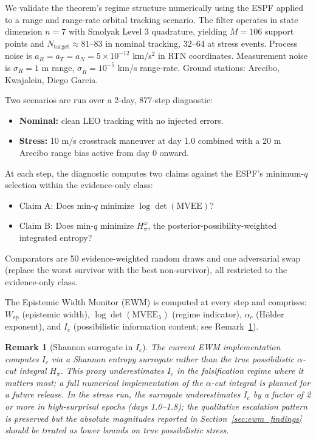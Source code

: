 \documentclass[12pt]{article}
\newtheorem{remark}[theorem]{Remark}
\begin{document}
We validate the theorem's regime structure numerically using the ESPF applied to a range and range-rate orbital tracking scenario. The filter operates in state dimension $n = 7$ with Smolyak Level 3 quadrature, yielding $M = 106$ support points and $N_{\mathrm{target}} \approx 81$--83 in nominal tracking, 32--64 at stress events. Process noise is $a_R = a_T = a_N = 5\times10^{-12}$ km/s$^2$ in RTN coordinates. Measurement noise is $\sigma_R = 1$ m range, $\sigma_{\dot{R}} = 10^{-5}$ km/s range-rate. Ground stations: Arecibo, Kwajalein, Diego Garcia.

Two scenarios are run over a 2-day, 877-step diagnostic:
\begin{itemize}
\item \textbf{Nominal:} clean LEO tracking with no injected errors.
\item \textbf{Stress:} 10 m/s crosstrack maneuver at day 1.0 combined with a 20 m Arecibo range bias active from day 0 onward.
\end{itemize}

At each step, the diagnostic computes two claims against the ESPF's minimum-$q$ selection within the evidence-only class:
\begin{itemize}
\item Claim A: Does min-$q$ minimize $\log\det(\mathrm{MVEE})$?
\item Claim B: Does min-$q$ minimize $H^\omega_\pi$, the posterior-possibility-weighted integrated entropy?
\end{itemize}
Comparators are 50 evidence-weighted random draws and one adversarial swap (replace the worst survivor with the best non-survivor), all restricted to the evidence-only class.

The Epistemic Width Monitor (EWM) is computed at every step and comprises: $W_\mathrm{ep}$ (epistemic width), $\log\det(\mathrm{MVEE}_\lambda)$ (regime indicator), $\alpha_c$ (H\"{o}lder exponent), and $I_c$ (possibilistic information content; see Remark~\ref{rem:shannon}).

\begin{remark}[Shannon surrogate in $I_c$]
\label{rem:shannon}
The current EWM implementation computes $I_c$ via a Shannon entropy surrogate rather than the true possibilistic $\alpha$-cut integral $H_\pi$. This proxy underestimates $I_c$ in the falsification regime where it matters most; a full numerical implementation of the $\alpha$-cut integral is planned for a future release. In the stress run, the surrogate underestimates $I_c$ by a factor of 2 or more in high-surprisal epochs (days 1.0--1.8); the qualitative escalation pattern is preserved but the absolute magnitudes reported in Section~\ref{sec:ewm_findings} should be treated as lower bounds on true possibilistic stress.
\end{remark}
\end{document}
